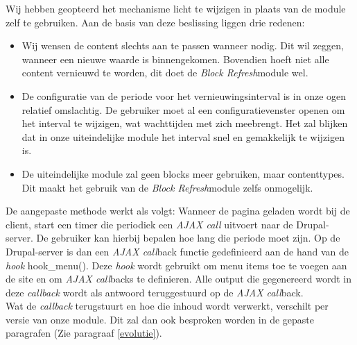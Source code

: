 Wij hebben geopteerd het mechanisme licht te wijzigen in plaats van de module zelf te gebruiken. Aan de basis van deze beslissing liggen drie redenen:
\begin{itemize}
\item Wij wensen de content slechts aan te passen wanneer nodig. Dit wil zeggen, wanneer een nieuwe waarde is binnengekomen. Bovendien hoeft niet alle content vernieuwd te worden, dit doet de \textit{Block Refresh}module wel.
\item De configuratie van de periode voor het vernieuwingsinterval is in onze ogen relatief omslachtig. De gebruiker moet al een configuratievenster openen om het interval te wijzigen, wat wachttijden met zich meebrengt. Het zal blijken dat in onze uiteindelijke module het interval snel en gemakkelijk te wijzigen is. 
\item De uiteindelijke module zal geen blocks meer gebruiken, maar contenttypes. Dit maakt het gebruik van de \textit{Block Refresh}module zelfs onmogelijk.
\end{itemize}

De aangepaste methode werkt als volgt: Wanneer de pagina geladen wordt bij de client, start een timer die periodiek een \textit{AJAX call} uitvoert naar de Drupal-server. De gebruiker kan hierbij bepalen hoe lang die periode moet zijn. Op de Drupal-server is dan een \textit{AJAX call}back functie gedefinieerd aan de hand van de \textit{hook} hook\_menu(). Deze \textit{hook} wordt gebruikt om menu items toe te voegen aan de site en om \textit{AJAX call}backs te definieren. Alle output die gegenereerd wordt in deze \textit{callback} wordt als antwoord teruggestuurd op de \textit{AJAX call}back.\\

Wat de \textit{callback} terugstuurt en hoe die inhoud wordt verwerkt, verschilt per versie van onze module. Dit zal dan ook besproken worden in de gepaste paragrafen (Zie paragraaf \ref{evolutie}).

